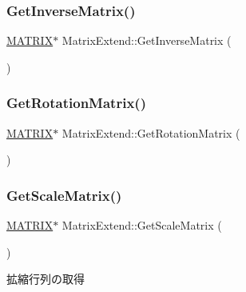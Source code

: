 \subsubsection{\texorpdfstring{Get\+Inverse\+Matrix()}{GetInverseMatrix()}}
{\footnotesize\ttfamily \mbox{\hyperlink{_vector3_d_8h_a032295cd9fb1b711757c90667278e744}{M\+A\+T\+R\+IX}}$\ast$ Matrix\+Extend\+::\+Get\+Inverse\+Matrix (\begin{DoxyParamCaption}{ }\end{DoxyParamCaption})\hspace{0.3cm}{\ttfamily [inline]}}

\mbox{\label{class_matrix_extend_a6e10c2692b92f15ea4a1a69fc22c66c4}} 
\subsubsection{\texorpdfstring{Get\+Rotation\+Matrix()}{GetRotationMatrix()}}
{\footnotesize\ttfamily \mbox{\hyperlink{_vector3_d_8h_a032295cd9fb1b711757c90667278e744}{M\+A\+T\+R\+IX}}$\ast$ Matrix\+Extend\+::\+Get\+Rotation\+Matrix (\begin{DoxyParamCaption}{ }\end{DoxyParamCaption})\hspace{0.3cm}{\ttfamily [inline]}}

\mbox{\label{class_matrix_extend_a13d6cb82385873959bde75fb64235943}} 
\subsubsection{\texorpdfstring{Get\+Scale\+Matrix()}{GetScaleMatrix()}}
{\footnotesize\ttfamily \mbox{\hyperlink{_vector3_d_8h_a032295cd9fb1b711757c90667278e744}{M\+A\+T\+R\+IX}}$\ast$ Matrix\+Extend\+::\+Get\+Scale\+Matrix (\begin{DoxyParamCaption}{ }\end{DoxyParamCaption})\hspace{0.3cm}{\ttfamily [inline]}}



拡縮行列の取得 

